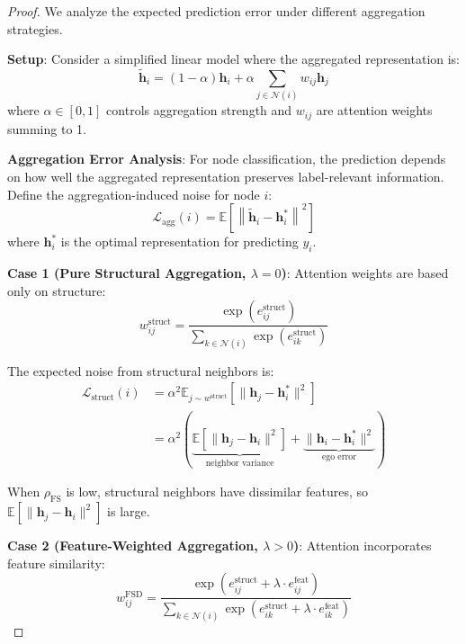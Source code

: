 \begin{proof}
We analyze the expected prediction error under different aggregation strategies.

\textbf{Setup}: Consider a simplified linear model where the aggregated representation is:
\begin{equation}
\tilde{\mathbf{h}}_i = (1-\alpha) \mathbf{h}_i + \alpha \sum_{j \in \mathcal{N}(i)} w_{ij} \mathbf{h}_j
\end{equation}
where $\alpha \in [0,1]$ controls aggregation strength and $w_{ij}$ are attention weights summing to 1.

\textbf{Aggregation Error Analysis}: For node classification, the prediction depends on how well the aggregated representation preserves label-relevant information. Define the aggregation-induced noise for node $i$:
\begin{equation}
\mathcal{L}_{\text{agg}}(i) = \mathbb{E}\left[\left\| \tilde{\mathbf{h}}_i - \mathbf{h}_i^* \right\|^2\right]
\end{equation}
where $\mathbf{h}_i^*$ is the optimal representation for predicting $y_i$.

\textbf{Case 1 (Pure Structural Aggregation, $\lambda = 0$)}: Attention weights are based only on structure:
\begin{equation}
w_{ij}^{\text{struct}} = \frac{\exp(e_{ij}^{\text{struct}})}{\sum_{k \in \mathcal{N}(i)} \exp(e_{ik}^{\text{struct}})}
\end{equation}

The expected noise from structural neighbors is:
\begin{align}
\mathcal{L}_{\text{struct}}(i) &= \alpha^2 \mathbb{E}_{j \sim w^{\text{struct}}}\left[\|\mathbf{h}_j - \mathbf{h}_i^*\|^2\right] \\
&= \alpha^2 \left( \underbrace{\mathbb{E}[\|\mathbf{h}_j - \mathbf{h}_i\|^2]}_{\text{neighbor variance}} + \underbrace{\|\mathbf{h}_i - \mathbf{h}_i^*\|^2}_{\text{ego error}} \right)
\end{align}

When $\rho_{\text{FS}}$ is low, structural neighbors have dissimilar features, so $\mathbb{E}[\|\mathbf{h}_j - \mathbf{h}_i\|^2]$ is large.

\textbf{Case 2 (Feature-Weighted Aggregation, $\lambda > 0$)}: Attention incorporates feature similarity:
\begin{equation}
w_{ij}^{\text{FSD}} = \frac{\exp(e_{ij}^{\text{struct}} + \lambda \cdot e_{ij}^{\text{feat}})}{\sum_{k \in \mathcal{N}(i)} \exp(e_{ik}^{\text{struct}} + \lambda \cdot e_{ik}^{\text{feat}})}
\end{equation}


\end{proof}
